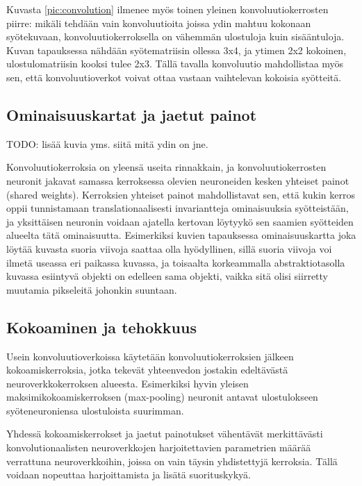 \documentclass[finnish]{tktltiki2}
\theoremstyle{definition}
\theoremstyle{remark}
\begin{document}
    Kuvasta \ref{pic:convolution} ilmenee myös toinen yleinen konvoluutiokerrosten piirre: mikäli tehdään vain konvoluutioita joissa ydin mahtuu kokonaan syötekuvaan, konvoluutiokerroksella on vähemmän ulostuloja kuin sisääntuloja. Kuvan tapauksessa nähdään syötematriisin ollessa 3x4, ja ytimen 2x2 kokoinen, ulostulomatriisin kooksi tulee 2x3. Tällä tavalla konvoluutio mahdollistaa myös sen, että konvoluutioverkot voivat ottaa vastaan vaihtelevan kokoisia syötteitä.

    \subsection{Ominaisuuskartat ja jaetut painot}
  TODO: lisää kuvia yms. siitä mitä ydin on jne.

    Konvoluutiokerroksia on yleensä useita rinnakkain, ja konvoluutiokerrosten neuronit jakavat samassa kerroksessa olevien neuroneiden kesken yhteiset painot (shared weights). Kerroksien yhteiset painot mahdollistavat sen, että kukin kerros oppii tunnistamaan translationaalisesti invariantteja ominaisuuksia syötteistään, ja yksittäisen neuronin voidaan ajatella kertovan löytyykö sen saamien syötteiden alueelta tätä ominaisuutta. Esimerkiksi kuvien tapauksessa ominaisuuskartta joka löytää kuvasta suoria viivoja saattaa olla hyödyllinen, sillä suoria viivoja voi ilmetä useassa eri paikassa kuvassa, ja toisaalta korkeammalla abstraktiotasolla kuvassa esiintyvä objekti on edelleen sama objekti, vaikka sitä olisi siirretty muutamia pikseleitä johonkin suuntaan.

    \subsection{Kokoaminen ja tehokkuus}
    Usein konvoluutioverkoissa käytetään konvoluutiokerroksien jälkeen kokoamiskerroksia, jotka tekevät yhteenvedon jostakin edeltävästä neuroverkkokerroksen alueesta. 
    Esimerkiksi hyvin yleisen maksimikokoamiskerroksen (max-pooling) neuronit antavat ulostulokseen syöteneuroniensa ulostuloista suurimman.

    Yhdessä kokoamiskerrokset ja jaetut painotukset vähentävät merkittävästi konvolutionaalisten neuroverkkojen harjoitettavien parametrien määrää verrattuna neuroverkkoihin, joissa on vain täysin yhdistettyjä kerroksia. Tällä voidaan nopeuttaa harjoittamista ja lisätä suorituskykyä.
\end{document}
